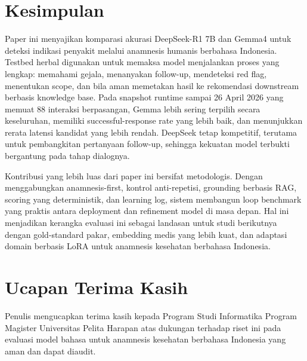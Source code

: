 \documentclass[conference]{IEEEtran}
\begin{document}
\section{Kesimpulan}
Paper ini menyajikan komparasi akurasi DeepSeek-R1 7B dan Gemma4 untuk deteksi indikasi penyakit melalui anamnesis humanis berbahasa Indonesia. Testbed herbal digunakan untuk memaksa model menjalankan proses yang lengkap: memahami gejala, menanyakan follow-up, mendeteksi red flag, menentukan scope, dan bila aman memetakan hasil ke rekomendasi downstream berbasis knowledge base. Pada snapshot runtime sampai 26 April 2026 yang memuat 88 interaksi berpasangan, Gemma lebih sering terpilih secara keseluruhan, memiliki successful-response rate yang lebih baik, dan menunjukkan rerata latensi kandidat yang lebih rendah. DeepSeek tetap kompetitif, terutama untuk pembangkitan pertanyaan follow-up, sehingga kekuatan model terbukti bergantung pada tahap dialognya.

Kontribusi yang lebih luas dari paper ini bersifat metodologis. Dengan menggabungkan anamnesis-first, kontrol anti-repetisi, grounding berbasis RAG, scoring yang deterministik, dan learning log, sistem membangun loop benchmark yang praktis antara deployment dan refinement model di masa depan. Hal ini menjadikan kerangka evaluasi ini sebagai landasan untuk studi berikutnya dengan gold-standard pakar, embedding medis yang lebih kuat, dan adaptasi domain berbasis LoRA untuk anamnesis kesehatan berbahasa Indonesia.

\section*{Ucapan Terima Kasih}
Penulis mengucapkan terima kasih kepada Program Studi Informatika Program Magister Universitas Pelita Harapan atas dukungan terhadap riset ini pada evaluasi model bahasa untuk anamnesis kesehatan berbahasa Indonesia yang aman dan dapat diaudit.
\end{document}
